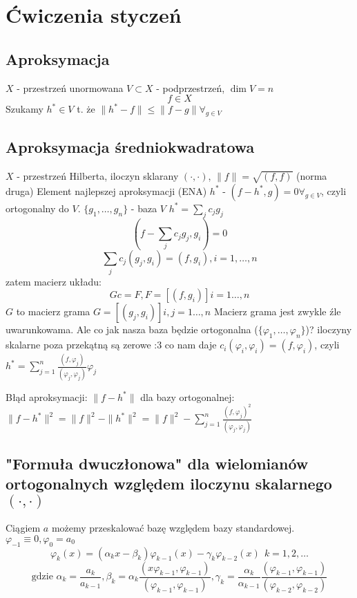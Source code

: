 \documentclass{article}
\begin{document}
\section{Ćwiczenia styczeń}
\subsection{Aproksymacja}
$X$ - przestrzeń unormowana
$V\subset X$ - podprzestrzeń, $ \dim V=n $
$$f\in X$$
Szukamy $h^*\in V$ t. że $ \|h^*-f\|\le \|f-g\|\forall_{g\in V} $
\subsection{Aproksymacja średniokwadratowa}
$ X $ - przestrzeń Hilberta, iloczyn sklarany $(\cdot, \cdot)$, $ \|f\|=\sqrt{(f, f)} $ (norma druga)
Element najlepszej aproksymacji (ENA) $ h^* $ - $ (f-h^*,g)=0 \forall_{g\in V} $, czyli ortogonalny do $ V $.
$ \{g_1, \dots, g_n\} $ - baza $ V $
$ h^*=\sum_j c_j g_j $
$$(f-\sum_j c_j g_j, g_i)=0$$
$$\sum_j c_j(g_j, g_i)=(f, g_i), i=1,\dots,n$$
zatem macierz układu:
$$Gc=F, F=[(f,g_i)]i=1\dots,n$$
$ G $ to macierz grama $ G=[(g_j,g_i)]i,j=1\dots,n $
Macierz grama jest zwykle źle uwarunkowama. Ale co jak nasza baza będzie ortogonalna ($ \{\varphi_1, \dots, \varphi_n\} $)? iloczyny skalarne poza przekątną są zerowe :3
co nam daje $ c_i(\varphi_i, \varphi_i)=(f, \varphi_i) $, czyli $ h^*=\sum_{j=1}^n \frac{(f,\varphi_j)}{(\varphi_j, \varphi_j)}\varphi_j$

Błąd aproksymacji: $ \|f-h^*\| $
dla bazy ortogonalnej:
$\|f-h^*\|^2=\|f\|^2-\|h^*\|^2=\|f\|^2-\sum_{j=1}^n \frac{(f,\varphi_j)^2}{(\varphi_j, \varphi_j)}$
\subsection{"Formuła dwuczłonowa" dla wielomianów ortogonalnych względem iloczynu skalarnego $ (\cdot, \cdot) $}
Ciągiem $ a $ możemy przeskalować bazę względem bazy standardowej.\\
$\varphi_{-1}\equiv0,\varphi_0=a_0$
$$\varphi_k(x)=(\alpha_kx-\beta_k)\varphi_{k-1}(x)-\gamma_k\varphi_{k-2}(x)\ \  k=1,2,\dots$$
$$\text{gdzie } \alpha_k=\frac{a_k}{a_{k-1}}, \beta_k=\alpha_k\frac{(x\varphi_{k-1},\varphi_{k-1})}{(\varphi_{k-1},\varphi_{k-1})}, \gamma_k=\frac{\alpha_k}{\alpha_{k-1}}\frac{(\varphi_{k-1},\varphi_{k-1})}{(\varphi_{k-2},\varphi_{k-2})}$$
\end{document}
